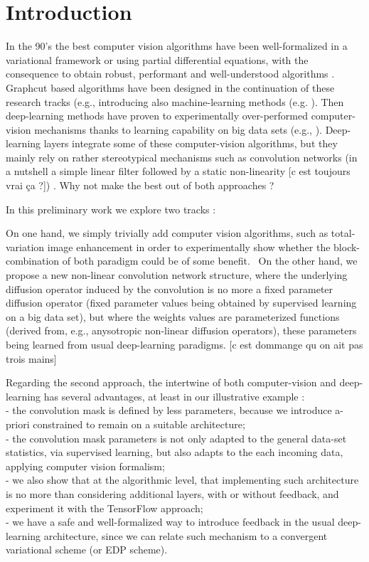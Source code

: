\documentclass{article}
\begin{document}
\section*{Introduction}

In the 90's the best computer vision algorithms have been well-formalized in a variational framework or using partial differential equations, with the consequence to obtain robust, performant and well-understood algorithms \cite{aubert-kornprobst:06}. Graphcut based algorithms have been designed in the continuation of these research tracks (e.g., \cite{boykov-kolmogorov:04} introducing also machine-learning methods (e.g. \cite{vieville-crahay:04,zhu-xu-etal:06,etyngier-segonne-etal:07b}). Then deep-learning methods have proven to experimentally over-performed computer-vision mechanisms thanks to learning capability on big data sets (e.g., \cite{Farabet2013Learning}). Deep-learning layers integrate some of these computer-vision algorithms, but they mainly rely on rather stereotypical mechanisms such as convolution networks (in a nutshell a simple linear filter followed by a static non-linearity [c est toujours vrai ça ?]) \cite{Bengio2009Learning}. Why not make the best out of both approaches ?

In this preliminary work we explore two tracks :

On one hand, we simply trivially add computer vision algorithms, such as total-variation image enhancement in order to experimentally show whether the block-combination of both paradigm could be of some benefit.
\
On the other hand, we propose a new non-linear convolution network structure, where the underlying diffusion operator induced by the convolution is no more a fixed parameter diffusion operator (fixed parameter values being obtained by supervised learning on a big data set), but where the weights values are parameterized functions (derived from, e.g., anysotropic non-linear diffusion operators), these parameters being learned from usual deep-learning paradigms.
[c est dommange qu on ait pas trois mains]

Regarding the second approach, the intertwine of both computer-vision and deep-learning has several advantages, at least in our illustrative example :
\\  - the convolution mask is defined by less parameters, because we introduce a-priori constrained to remain on a suitable architecture;
\\  - the convolution mask parameters is not only adapted to the general data-set statistics, via supervised learning, but also adapts to the each incoming data, applying computer vision formalism;
\\  - we also show that at the algorithmic level, that implementing such architecture is no more than considering additional layers, with or without feedback, and experiment it with the TensorFlow approach;
\\  - we have a safe and well-formalized way to introduce feedback in the usual deep-learning architecture, since we can relate such mechanism to a convergent variational scheme (or EDP scheme).
 
\end{document}
